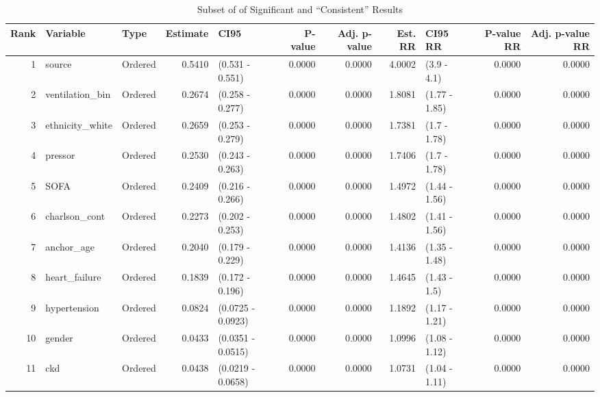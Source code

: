 \begin{table}[ht]
\centering
\caption{Subset of of Significant and ``Consistent'' Results} 
\label{consisRes}
\begin{tabular}{rllrlrrrlrr}
  \hline
Rank & Variable & Type & Estimate & CI95 & P-value & Adj. p-value & Est. RR & CI95 RR & P-value RR & Adj. p-value RR \\ 
  \hline
    1 & source & Ordered & 0.5410 & (0.531 - 0.551) & 0.0000 & 0.0000 & 4.0002 & (3.9 - 4.1) & 0.0000 & 0.0000 \\ 
      2 & ventilation\_bin & Ordered & 0.2674 & (0.258 - 0.277) & 0.0000 & 0.0000 & 1.8081 & (1.77 - 1.85) & 0.0000 & 0.0000 \\ 
      3 & ethnicity\_white & Ordered & 0.2659 & (0.253 - 0.279) & 0.0000 & 0.0000 & 1.7381 & (1.7 - 1.78) & 0.0000 & 0.0000 \\ 
      4 & pressor & Ordered & 0.2530 & (0.243 - 0.263) & 0.0000 & 0.0000 & 1.7406 & (1.7 - 1.78) & 0.0000 & 0.0000 \\ 
      5 & SOFA & Ordered & 0.2409 & (0.216 - 0.266) & 0.0000 & 0.0000 & 1.4972 & (1.44 - 1.56) & 0.0000 & 0.0000 \\ 
      6 & charlson\_cont & Ordered & 0.2273 & (0.202 - 0.253) & 0.0000 & 0.0000 & 1.4802 & (1.41 - 1.56) & 0.0000 & 0.0000 \\ 
      7 & anchor\_age & Ordered & 0.2040 & (0.179 - 0.229) & 0.0000 & 0.0000 & 1.4136 & (1.35 - 1.48) & 0.0000 & 0.0000 \\ 
      8 & heart\_failure & Ordered & 0.1839 & (0.172 - 0.196) & 0.0000 & 0.0000 & 1.4645 & (1.43 - 1.5) & 0.0000 & 0.0000 \\ 
      9 & hypertension & Ordered & 0.0824 & (0.0725 - 0.0923) & 0.0000 & 0.0000 & 1.1892 & (1.17 - 1.21) & 0.0000 & 0.0000 \\ 
     10 & gender & Ordered & 0.0433 & (0.0351 - 0.0515) & 0.0000 & 0.0000 & 1.0996 & (1.08 - 1.12) & 0.0000 & 0.0000 \\ 
     11 & ckd & Ordered & 0.0438 & (0.0219 - 0.0658) & 0.0000 & 0.0000 & 1.0731 & (1.04 - 1.11) & 0.0000 & 0.0000 \\ 
   \hline
\end{tabular}
\end{table}
